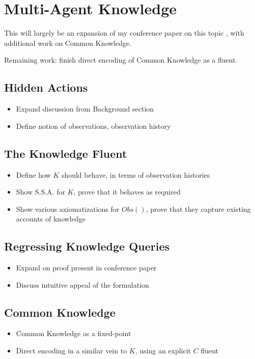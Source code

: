 \chapter{Multi-Agent Knowledge}\label{ch:knowledge}

This will largely be an expansion of my conference paper on this topic \cite{kelly07sc_know_obs}, with additional work on Common Knowledge.

Remaining work:  finish direct encoding of Common Knowledge as a fluent.

\section{Hidden Actions}

\begin{itemize}
\item Expand discussion from Background section
\item Define notion of observations, observation history
\end{itemize}

\section{The Knowledge Fluent}

\begin{itemize}
\item Define how $K$ should behave, in terms of observation histories
\item Show S.S.A. for $K$, prove that it behaves as required
\item Show various axiomatizations for $Obs()$, prove that they capture
existing accounts of knowledge
\end{itemize}

\section{Regressing Knowledge Queries}

\begin{itemize}
\item Expand on proof present in conference paper
\item Discuss intuitive appeal of the formulation
\end{itemize}

\section{Common Knowledge}

\begin{itemize}
\item Common Knowledge as a fixed-point
\item Direct encoding in a similar vein to $K$, using an explicit $C$ fluent
\end{itemize}


